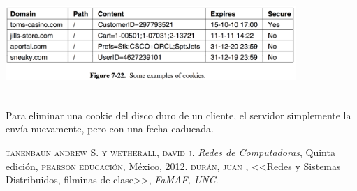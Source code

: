 \documentclass[10pt,a4paper]{report}
\begin{document}
				\begin{center}
					\includegraphics[width=11cm, height=4cm]{./imagenes/cookie.png} 
				\end{center}
								
				\par Para eliminar una cookie del disco duro de un cliente, el servidor simplemente la envía nuevamente, pero con una fecha caducada.



\begin{thebibliography}{X}
 \textsc{tanenbaun andrew S. y wetherall, david j.}
\textit{Redes de Computadoras}, Quinta edición,
\textsc{pearson educación}, México, 2012.
 \textsc{durán, juan },
<<Redes y Sistemas Distribuidos, filminas de clase>>,
\textit{FaMAF, UNC}.
\end{thebibliography}
\end{document}
